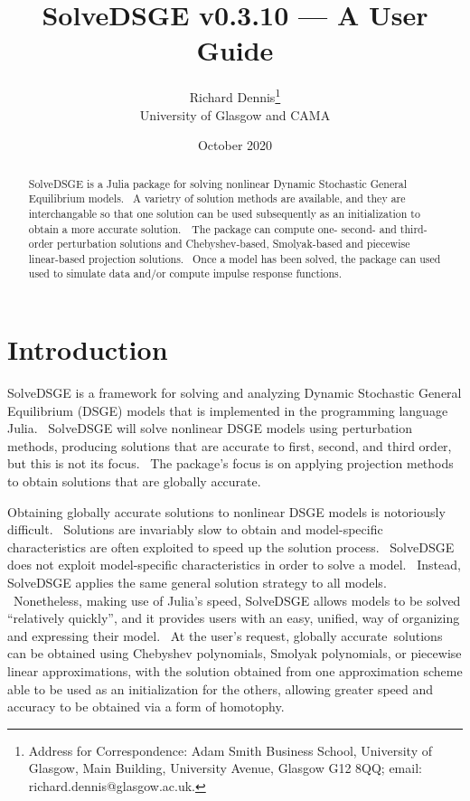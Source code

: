 \documentclass[notitlepage,11pt]{article}
\begin{document}
\author{Richard Dennis\thanks{%
Address for Correspondence: Adam Smith Business School, University of
Glasgow, Main Building, University Avenue, Glasgow G12 8QQ; email:
richard.dennis@glasgow.ac.uk.} \\
University of Glasgow and CAMA}
\title{SolveDSGE v0.3.10 --- A User Guide}
\date{October 2020}
\maketitle

\begin{abstract}
SolveDSGE is a Julia package for solving nonlinear Dynamic Stochastic
General Equilibrium models. \ A varietry of solution methods are available,
and they are interchangable so that one solution can be used subsequently as
an initialization to obtain a more accurate solution.\noindent\ \ The
package can compute one- second- and third-order perturbation solutions and
Chebyshev-based, Smolyak-based and piecewise linear-based projection
solutions. \ Once a model has been solved, the package can used used to
simulate data and/or compute impulse response functions.

\vspace{0.12in}
\end{abstract}

\thispagestyle{empty}\newpage \setlength{\baselineskip}{18.95pt}%
\setcounter{page}{1}

\section{Introduction}

SolveDSGE is a framework for solving and analyzing Dynamic Stochastic
General Equilibrium (DSGE) models that is implemented in the programming
language Julia. \ SolveDSGE will solve nonlinear DSGE models using
perturbation methods, producing solutions that are accurate to first,
second, and third order, but this is not its focus. \ The package's focus is
on applying projection methods to obtain solutions that are globally
accurate.

Obtaining globally accurate solutions to nonlinear DSGE models is
notoriously difficult. \ Solutions are invariably slow to obtain and
model-specific characteristics are often exploited to speed up the solution
process. \ SolveDSGE does not exploit model-specific characteristics in
order to solve a model. \ Instead, SolveDSGE applies the same general
solution strategy to all models. \ Nonetheless, making use of Julia's speed,
SolveDSGE allows models to be solved \textquotedblleft relatively
quickly\textquotedblright , and it provides users with an easy, unified, way
of organizing and expressing their model. \ At the user's request, globally
accurate\ solutions can be obtained using Chebyshev polynomials, Smolyak
polynomials, or piecewise linear approximations, with the solution obtained
from one approximation scheme able to be used as an initialization for the
others, allowing greater speed and accuracy to be obtained via a form of
homotophy.
\end{document}
